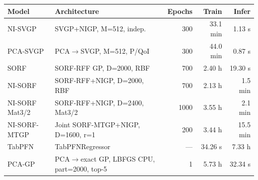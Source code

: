 \begin{tabular}{llrrr}
\toprule
Model & Architecture & Epochs & Train & Infer \\
\midrule
NI-SVGP & SVGP+NIGP, M=512, indep. & 300 & 33.1 min & 1.13 s \\
PCA-SVGP & PCA$\to$SVGP, M=512, P/QoI & 300 & 44.0 min & 0.87 s \\
SORF & SORF-RFF GP, D=2000, RBF & 700 & 2.40 h & 19.30 s \\
NI-SORF & SORF-RFF+NIGP, D=2000, RBF & 700 & 2.13 h & 1.5 min \\
NI-SORF Mat3/2 & SORF-RFF+NIGP, D=2400, Mat3/2 & 1000 & 3.55 h & 2.1 min \\
NI-SORF-MTGP & Joint SORF-MTGP+NIGP, D=1600, r=1 & 200 & 3.44 h & 15.5 min \\
TabPFN & TabPFNRegressor & --- & 34.26 s & 7.33 h \\
PCA-GP & PCA$\to$exact GP, LBFGS CPU, part=2000, top-5 & 1 & 5.73 h & 32.34 s \\
\bottomrule
\end{tabular}
